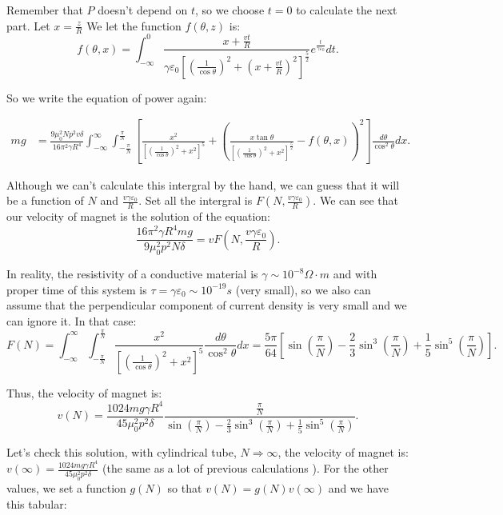 \documentclass[12pt]{article}
\begin{document}
\noindent Remember that $P$ doesn't depend on $t$, so we choose $t=0$ to calculate the next part. Let $x = \frac{z}{R}$ We let the function $f(\theta,z)$ is:
$$f(\theta,x) = \int_{-\infty}^0 \frac{x + \frac{vt}{R}}{\gamma \varepsilon_0 \left[ \left( \frac{1}{\cos \theta} \right)^2 + \left(x + \frac{vt}{R} \right)^2 \right]^{\frac{5}{2}} } e^{\frac{t}{\gamma \varepsilon_0}} dt .$$

\noindent So we write the equation of power again:

\begin{align*}
	mg & = \frac{9 \mu_0^2 N p^2 v \delta}{16 \pi^2 \gamma R^4} \int_{-\infty}^{\infty} \int_{-\frac{\pi}{N}}^{\frac{\pi}{N}} \left[ \frac{x^2}{\left[ \left( \frac{1}{\cos \theta} \right)^2 + x^2 \right]^5} + \left( \frac{x \tan \theta}{\left[ \left( \frac{1}{\cos \theta} \right)^2 + x^2 \right]^{\frac{5}{2}}} - f(\theta, x) \right)^2 \right] \frac{d \theta}{\cos^2 \theta} dx . 
\end{align*}

\noindent Although we can't calculate this intergral by the hand, we can guess that it will be a function of $N$ and $\frac{v \gamma \varepsilon_0}{R}$. Set all the intergral is $F \left(N, \frac{v \gamma \varepsilon_0}{R} \right)$. We can see that our velocity of magnet is the solution of the equation:
$$ \frac{16 \pi^2 \gamma R^4 mg}{9 \mu_0^2 p^2 N \delta} = v F \left(N, \frac{v \gamma \varepsilon_0}{R} \right) .$$ 
	
\noindent In reality, the resistivity of a conductive material is $\gamma \sim 10^{-8} \si{\Omega \cdot m} $ and with proper time of this system is $\tau = \gamma \varepsilon_0 \sim 10^{-19} \si{s} $ (very small), so we also can assume that the perpendicular component of current density is very small and we can ignore it. In that case:
$$ F(N) = \int_{-\infty}^{\infty} \int_{-\frac{\pi}{N}}^{\frac{\pi}{N}} \frac{x^2}{\left[ \left( \frac{1}{\cos \theta} \right)^2 + x^2 \right]^5 } \frac{d \theta}{\cos^2 \theta} dx = \frac{5 \pi}{64} \left[ \sin \left( \frac{\pi}{N} \right) - \frac{2}{3} \sin^3 \left( \frac{\pi}{N} \right) + \frac{1}{5} \sin^5 \left( \frac{\pi}{N} \right) \right] .$$
	
\noindent Thus, the velocity of magnet is:
$$ v (N) = \frac{1024 mg \gamma R^4}{45 \mu_0^2 p^2 \delta }
\frac{ \frac{\pi}{N} }{ \sin \left( \frac{\pi}{N} \right) - \frac{2}{3} \sin^3 \left( \frac{\pi}{N} \right) + \frac{1}{5} \sin^5 \left( \frac{\pi}{N} \right) } .$$

\noindent Let's check this solution, with cylindrical tube, $N \Rightarrow \infty$, the velocity of magnet is: $ v (\infty) = \frac{1024 mg \gamma R^4}{45 \mu_0^2 p^2 \delta } $ (the same as a lot of previous calculations \cite{doi:10.1119/1.2203645} ). For the other values, we set a function $g(N)$ so that $v(N) = g(N) v(\infty)$ and we have this tabular:
\end{document}
